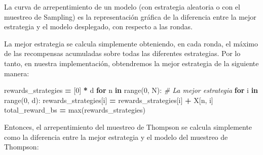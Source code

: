 \documentclass[
]{book}
\newenvironment{Shaded}{\begin{snugshade}}{\end{snugshade}}
\newcommand{\BuiltInTok}[1]{#1}
\newcommand{\CommentTok}[1]{\textcolor[rgb]{0.56,0.35,0.01}{\textit{#1}}}
\newcommand{\ControlFlowTok}[1]{\textcolor[rgb]{0.13,0.29,0.53}{\textbf{#1}}}
\newcommand{\DecValTok}[1]{\textcolor[rgb]{0.00,0.00,0.81}{#1}}
\newcommand{\KeywordTok}[1]{\textcolor[rgb]{0.13,0.29,0.53}{\textbf{#1}}}
\newcommand{\NormalTok}[1]{#1}
\newcommand{\OperatorTok}[1]{\textcolor[rgb]{0.81,0.36,0.00}{\textbf{#1}}}
\begin{document}
La curva de arrepentimiento de un modelo (con estrategia aleatoria o con el muestreo de Sampling) es la representación gráfica de la diferencia entre la mejor estrategia y el modelo desplegado, con respecto a las rondas.

La mejor estrategia se calcula simplemente obteniendo, en cada ronda, el máximo de las recompensas acumuladas sobre todas las diferentes estrategias. Por lo tanto, en nuestra implementación, obtendremos la mejor estrategia de la siguiente manera:

\begin{Shaded}
\begin{Highlighting}[]
\NormalTok{rewards\_strategies }\OperatorTok{=}\NormalTok{ [}\DecValTok{0}\NormalTok{] }\OperatorTok{*}\NormalTok{ d}
\ControlFlowTok{for}\NormalTok{ n }\KeywordTok{in} \BuiltInTok{range}\NormalTok{(}\DecValTok{0}\NormalTok{, N):}
    \CommentTok{\# La mejor estrategia}
    \ControlFlowTok{for}\NormalTok{ i }\KeywordTok{in} \BuiltInTok{range}\NormalTok{(}\DecValTok{0}\NormalTok{, d):}
\NormalTok{        rewards\_strategies[i] }\OperatorTok{=}\NormalTok{ rewards\_strategies[i] }\OperatorTok{+}\NormalTok{ X[n, i]}
\NormalTok{    total\_reward\_bs }\OperatorTok{=} \BuiltInTok{max}\NormalTok{(rewards\_strategies)}
\end{Highlighting}
\end{Shaded}

Entonces, el arrepentimiento del muestreo de Thompson se calcula simplemente como la diferencia entre la mejor estrategia y el modelo del muestreo de Thompson:
\end{document}
